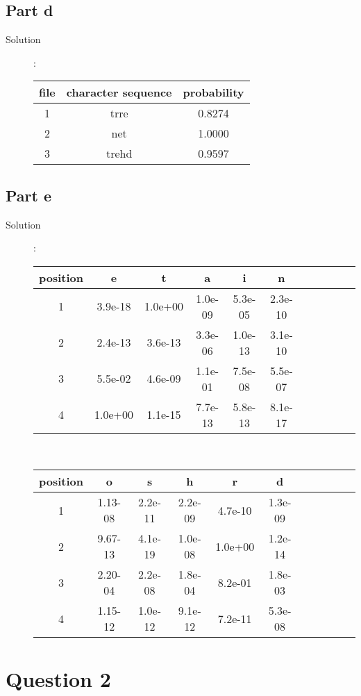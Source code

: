 \documentclass[a4paper,11pt]{article}
\begin{document}
\subsection{Part d}
\begin{description}
  \item [Solution]: 

\begin{center}
\begin{tabular}{ c|c|c }
file & character sequence & probability \\ \hline
1 & trre & 0.8274 \\
2 & net & 1.0000 \\
3 & trehd & 0.9597
\end{tabular}
\end{center}
\end{description}
\subsection{Part e}
\begin{description}
  \item [Solution]: 

\begin{center}
\begin{tabular}{ c|c|c|c|c|c|c|c|c|c|c }
  position & e & t & a & i & n  \\ \hline
1  & 3.9e-18& 1.0e+00& 1.0e-09& 5.3e-05& 2.3e-10  \\
2  & 2.4e-13& 3.6e-13& 3.3e-06& 1.0e-13& 3.1e-10  \\
3  & 5.5e-02& 4.6e-09& 1.1e-01& 7.5e-08& 5.5e-07  \\
4  & 1.0e+00& 1.1e-15& 7.7e-13& 5.8e-13& 8.1e-17 
\end{tabular}
\\

\begin{tabular}{ c|c|c|c|c|c|c|c|c|c|c }
  position & o & s & h & r & d \\ \hline
1  & 1.13-08& 2.2e-11& 2.2e-09& 4.7e-10& 1.3e-09  \\
2  & 9.67-13& 4.1e-19& 1.0e-08& 1.0e+00& 1.2e-14  \\
3  & 2.20-04& 2.2e-08& 1.8e-04& 8.2e-01& 1.8e-03  \\
4  & 1.15-12& 1.0e-12& 9.1e-12& 7.2e-11& 5.3e-08 
\end{tabular}
\end{center}
\end{description}
\section{Question 2}
\end{document}
